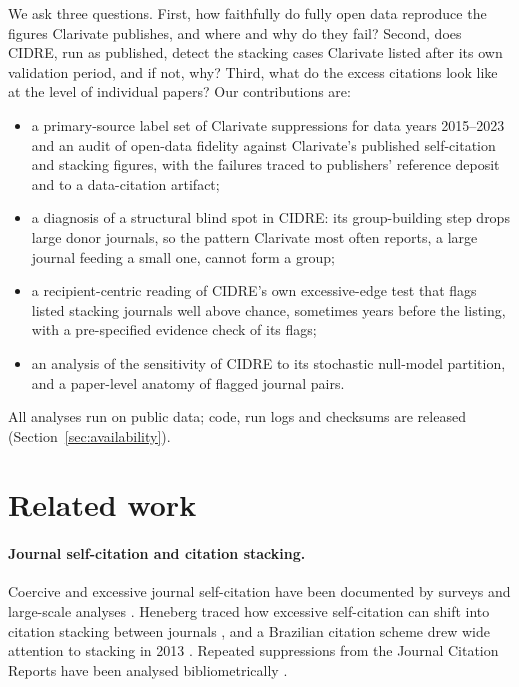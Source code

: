 \documentclass[11pt]{article}
\begin{document}
We ask three questions. First, how faithfully do fully open data reproduce the figures Clarivate publishes, and where
and why do they fail? Second, does CIDRE, run as published, detect the stacking cases Clarivate listed after its
own validation period, and if not, why? Third, what do the excess citations look like at the level of individual
papers? Our contributions are:
\begin{itemize}
  \item a primary-source label set of Clarivate suppressions for data years 2015--2023 and an audit of open-data
        fidelity against Clarivate's published self-citation and stacking figures, with the failures traced to
        publishers' reference deposit and to a data-citation artifact;
  \item a diagnosis of a structural blind spot in CIDRE: its group-building step drops large donor journals, so the
        pattern Clarivate most often reports, a large journal feeding a small one, cannot form a group;
  \item a recipient-centric reading of CIDRE's own excessive-edge test that flags listed stacking journals well above
        chance, sometimes years before the listing, with a pre-specified evidence check of its flags;
  \item an analysis of the sensitivity of CIDRE to its stochastic null-model partition, and a paper-level anatomy of
        flagged journal pairs.
\end{itemize}
All analyses run on public data; code, run logs and checksums are released (Section~\ref{sec:availability}).

\section{Related work}\label{sec:related}

\paragraph{Journal self-citation and citation stacking.}
Coercive and excessive journal self-citation have been documented by surveys and large-scale analyses
\cite{wilhite2012coercive,chorus2016coercive,taskin2021selfcitation}. Heneberg traced how excessive self-citation can
shift into citation stacking between journals \cite{heneberg2016stacking}, and a Brazilian citation scheme drew wide
attention to stacking in 2013 \cite{vannoorden2013brazil}. Repeated suppressions from the Journal Citation Reports
have been analysed bibliometrically \cite{moussa2022suppressed}.
\end{document}
